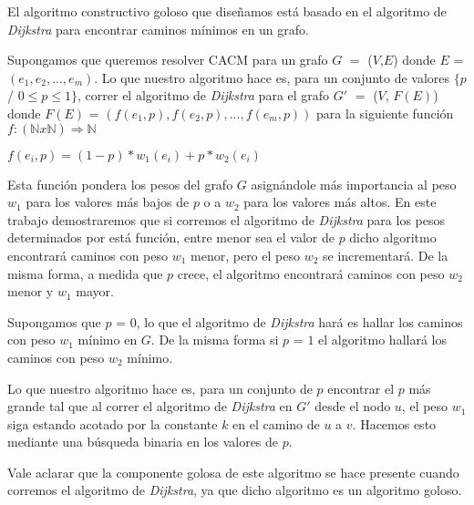 El algoritmo constructivo goloso que diseñamos está basado en el algoritmo de \emph{Dijkstra} para encontrar caminos mínimos en un grafo. 

Supongamos que queremos resolver CACM para un grafo $G$ $=$ ($V$,$E$) donde $E$ = $(e_1, e_2, ..., e_m)$. Lo que nuestro algoritmo hace es, para un conjunto de valores $\{p$ / $0 \leq p \leq 1\}$, correr el algoritmo de \emph{Dijkstra} para el grafo $G'$ $=$ ($V$, $F(E)$) donde $F(E)$ = $(f(e_1,p), f(e_2,p), ...,f(e_m,p))$ para la siguiente función $f: (\mathbb{N} x \mathbb{N}) \Rightarrow \mathbb{N}$

$f(e_i,p) = (1-p)*w_1(e_i) + p*w_2(e_i)$

Esta función pondera los pesos del grafo $G$ asignándole más importancia al peso $w_1$ para los valores más bajos de $p$ o a $w_2$ para los valores más altos. En este trabajo demostraremos que si corremos el algoritmo de \emph{Dijkstra} para los pesos determinados por está función, entre menor sea el valor de $p$ dicho algoritmo encontrará caminos con peso $w_1$ menor, pero el peso $w_2$ se incrementará. De la misma forma, a medida que $p$ crece, el algoritmo encontrará caminos con peso $w_2$ menor y $w_1$ mayor.

Supongamos que $p$ = $0$, lo que el algoritmo de \emph{Dijkstra} hará es hallar los caminos con peso $w_1$ mínimo en $G$. De la misma forma si $p$ = $1$ el algoritmo hallará los caminos con peso $w_2$ mínimo.

Lo que nuestro algoritmo hace es, para un conjunto de $p$ encontrar el $p$ más grande tal que al correr el algoritmo de \emph{Dijkstra} en $G'$ desde el nodo $u$, el peso $w_1$ siga estando acotado por la constante $k$ en el camino de $u$ a $v$. Hacemos esto mediante una búsqueda binaria en los valores de $p$.

Vale aclarar que la componente golosa de este algoritmo se hace presente cuando corremos el algoritmo de \emph{Dijkstra}, ya que dicho algoritmo es un algoritmo goloso.